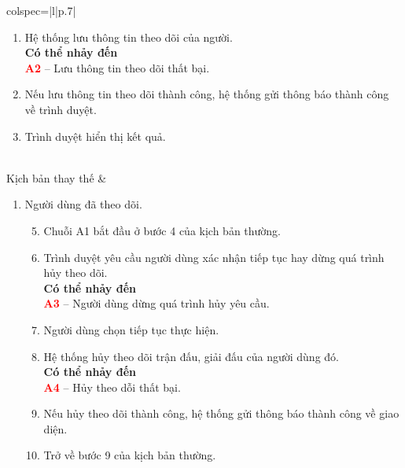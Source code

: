 \documentclass{article}
\begin{document}
\begin{longtblr}[caption = {Đặc tả usecase 	Theo dõi trận đấu, giải đấu},
  label = {tab:usecase1-spec},]{colspec={|l|p{.7\linewidth}|}}
\begin{minipage}{\linewidth}
\begin{enumerate}
      \item Hệ thống lưu thông tin theo dõi của người.  \\
            \textbf{Có thể nhảy đến}\\
            \textbf{\textcolor{red}{A2}} -- Lưu thông tin theo dõi thất bại.
       \item Nếu lưu thông tin theo dõi thành công, hệ thống gửi thông báo thành công về trình duyệt.
       \item Trình duyệt hiển thị kết quả.
    \end{enumerate}
    \vskip 1pt
  \end{minipage}
  \\\hline
  Kịch bản thay thế    &
  \begin{minipage}{\linewidth}
    \vskip 4pt
    \begin{enumerate}[label={\textbf{\textcolor{red}{A\arabic*}} --}, align=left, itemsep=-5pt]
      \item  Người dùng đã theo dõi.  \\
            \vspace{-1.5em}
            \begin{enumerate}[leftmargin=-5px, align=left, label=\arabic*.]
              \setcounter{enumii}{4}
              \item[]
                    \hspace{-25px} Chuỗi A1 bắt đầu ở bước 4 của kịch bản thường.
              \item Trình duyệt yêu cầu người dùng xác nhận tiếp tục hay dừng quá trình hủy theo dõi.\\
                  \textbf{Có thể nhảy đến}\\
                  \textbf{\textcolor{red}{A3}} -- Người dùng dừng quá trình hủy yêu cầu.
              \item Người dùng chọn tiếp tục thực hiện.
              \item Hệ thống hủy theo dõi trận đấu, giải đấu của người dùng đó.\\
                  \textbf{Có thể nhảy đến}\\
                  \textbf{\textcolor{red}{A4}} -- Hủy theo dỗi thất bại.
            
              \item Nếu hủy theo dõi thành công, hệ thống gửi thông báo thành công về giao diện.
              \item[]
                    \hspace{-25px} Trở về bước 9 của kịch bản thường.
            \end{enumerate}
            

\end{enumerate}
\end{minipage}
\end{longtblr}
\end{document}
